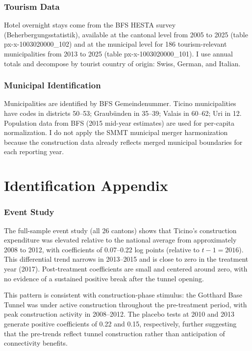 \documentclass[12pt]{article}
\begin{document}
\subsubsection*{Tourism Data} Hotel overnight stays come from the BFS HESTA survey (Beherbergungsstatistik), available at the cantonal level from 2005 to 2025 (table px-x-1003020000\_102) and at the municipal level for 186 tourism-relevant municipalities from 2013 to 2025 (table px-x-1003020000\_101). I use annual totals and decompose by tourist country of origin: Swiss, German, and Italian.

\subsubsection*{Municipal Identification} Municipalities are identified by BFS Gemeindenummer. Ticino municipalities have codes in districts 50--53; Graub\"unden in 35--39; Valais in 60--62; Uri in 12. Population data from BFS (2015 mid-year estimates) are used for per-capita normalization. I do not apply the SMMT municipal merger harmonization because the construction data already reflects merged municipal boundaries for each reporting year.

\section{Identification Appendix}
\label{sec:event_study}

\subsubsection*{Event Study} The full-sample event study (all 26 cantons) shows that Ticino's construction expenditure was elevated relative to the national average from approximately 2008 to 2012, with coefficients of 0.07--0.22 log points (relative to $t-1=2016$). This differential trend narrows in 2013--2015 and is close to zero in the treatment year (2017). Post-treatment coefficients are small and centered around zero, with no evidence of a sustained positive break after the tunnel opening.

This pattern is consistent with construction-phase stimulus: the Gotthard Base Tunnel was under active construction throughout the pre-treatment period, with peak construction activity in 2008--2012. The placebo tests at 2010 and 2013 generate positive coefficients of 0.22 and 0.15, respectively, further suggesting that the pre-trends reflect tunnel construction rather than anticipation of connectivity benefits.
\end{document}
